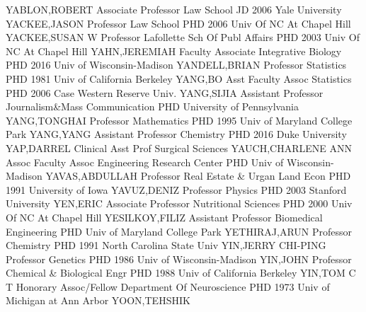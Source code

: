 \documentclass[
]{article}
\begin{document}
YABLON,ROBERT \textbar Associate Professor \textbar Law School
\textbar JD 2006 Yale University \textbar{} 
\textbar YACKEE,JASON \textbar Professor \textbar Law School
\textbar PHD 2006 Univ Of NC At Chapel Hill \textbar{} 
\textbar YACKEE,SUSAN W \textbar Professor \textbar Lafollette Sch Of
Publ Affairs \textbar PHD 2003 Univ Of NC At Chapel Hill \textbar{}
 \textbar YAHN,JEREMIAH \textbar Faculty Associate
\textbar Integrative Biology \textbar PHD 2016 Univ of Wisconsin-Madison
\textbar{}  \textbar YANDELL,BRIAN \textbar Professor
\textbar Statistics \textbar PHD 1981 Univ of California Berkeley
\textbar{}  \textbar YANG,BO \textbar Asst Faculty Assoc
\textbar Statistics \textbar PHD 2006 Case Western Reserve Univ.
\textbar{}  \textbar YANG,SIJIA \textbar Assistant Professor
\textbar Journalism\&Mass Communication \textbar PHD University of
Pennsylvania \textbar{}  \textbar YANG,TONGHAI
\textbar Professor \textbar Mathematics \textbar PHD 1995 Univ of
Maryland College Park \textbar{}  \textbar YANG,YANG
\textbar Assistant Professor \textbar Chemistry \textbar PHD 2016 Duke
University \textbar{}  \textbar YAP,DARREL \textbar Clinical
Asst Prof \textbar Surgical Sciences \textbar YAUCH,CHARLENE ANN
\textbar{}  \textbar Assoc Faculty Assoc
\textbar Engineering Research Center \textbar PHD Univ of
Wisconsin-Madison \textbar YAVAS,ABDULLAH \textbar{} 
\textbar Professor \textbar Real Estate \& Urgan Land Econ \textbar PHD
1991 University of Iowa \textbar YAVUZ,DENIZ \textbar{} 
\textbar Professor \textbar Physics \textbar PHD 2003 Stanford
University \textbar YEN,ERIC \textbar{}  \textbar Associate
Professor \textbar Nutritional Sciences \textbar PHD 2000 Univ Of NC At
Chapel Hill \textbar YESILKOY,FILIZ \textbar{} 
\textbar Assistant Professor \textbar Biomedical Engineering
\textbar PHD Univ of Maryland College Park \textbar YETHIRAJ,ARUN
\textbar{}  \textbar Professor \textbar Chemistry
\textbar PHD 1991 North Carolina State Univ \textbar YIN,JERRY CHI-PING
\textbar{}  \textbar Professor \textbar Genetics
\textbar PHD 1986 Univ of Wisconsin-Madison \textbar YIN,JOHN \textbar{}
 \textbar Professor \textbar Chemical \& Biological Engr
\textbar PHD 1988 Univ of California Berkeley \textbar YIN,TOM C T
\textbar{}  \textbar Honorary Assoc/Fellow
\textbar Department Of Neuroscience \textbar PHD 1973 Univ of Michigan
at Ann Arbor \textbar YOON,TEHSHIK \textbar{} 
\end{document}
